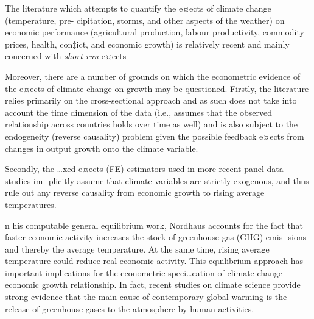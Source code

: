 \documentclass[
]{book}
\begin{document}
The literature which attempts to quantify the e¤ects of climate change (temperature, pre-
cipitation, storms, and other aspects of the weather) on economic performance (agricultural
production, labour productivity, commodity prices, health, con‡ict, and economic growth)
is relatively recent and mainly concerned with \emph{short-run} e¤ects

Moreover, there are a number of grounds on which the econometric evidence
of the e¤ects of climate change on growth may be questioned. Firstly, the literature relies
primarily on the cross-sectional approach
and as such does not take into account
the time dimension of the data (i.e., assumes that the observed relationship across countries
holds over time as well) and is also subject to the endogeneity (reverse causality) problem
given the possible feedback e¤ects from changes in output growth onto the climate variable.

Secondly, the \ldots xed e¤ects (FE) estimators used in more recent panel-data studies im-
plicitly assume that climate variables are strictly exogenous, and thus rule out any reverse
causality from economic growth to rising average temperatures.

n his computable general equilibrium work, Nordhaus accounts
for the fact that faster economic activity increases the stock of greenhouse gas (GHG) emis-
sions and thereby the average temperature. At the same time, rising average temperature
could reduce real economic activity. This equilibrium approach has important implications
for the econometric speci\ldots cation of climate change--economic growth relationship.
In fact, recent studies on climate science provide strong evidence that the main cause of
contemporary global warming is the release of greenhouse gases to the atmosphere by human
activities.
\end{document}
